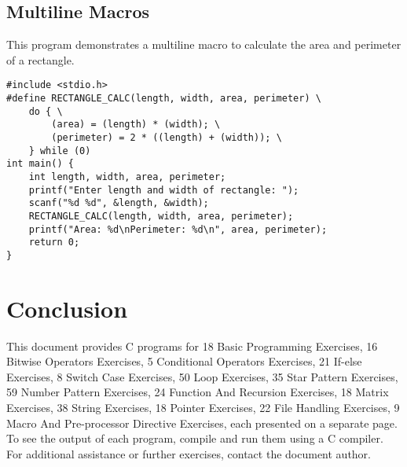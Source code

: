 \documentclass[a4paper,12pt]{article}
\begin{document}
\subsection{Multiline Macros}
This program demonstrates a multiline macro to calculate the area and perimeter of a rectangle.
\begin{lstlisting}[caption={Multiline Macros}]
#include <stdio.h>
#define RECTANGLE_CALC(length, width, area, perimeter) \
    do { \
        (area) = (length) * (width); \
        (perimeter) = 2 * ((length) + (width)); \
    } while (0)
int main() {
    int length, width, area, perimeter;
    printf("Enter length and width of rectangle: ");
    scanf("%d %d", &length, &width);
    RECTANGLE_CALC(length, width, area, perimeter);
    printf("Area: %d\nPerimeter: %d\n", area, perimeter);
    return 0;
}
\end{lstlisting}
\clearpage

\section{Conclusion}
This document provides C programs for 18 Basic Programming Exercises, 16 Bitwise Operators Exercises, 5 Conditional Operators Exercises, 21 If-else Exercises, 8 Switch Case Exercises, 50 Loop Exercises, 35 Star Pattern Exercises, 59 Number Pattern Exercises, 24 Function And Recursion Exercises, 18 Matrix Exercises, 38 String Exercises, 18 Pointer Exercises, 22 File Handling Exercises, 9 Macro And Pre-processor Directive Exercises, each presented on a separate page. To see the output of each program, compile and run them using a C compiler. For additional assistance or further exercises, contact the document author.
\end{document}
